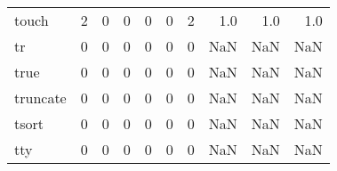 \begin{tabular}{lrrrrrrrrr}
touch     &                                                  2 &                                                  0 &                                                  0 &                                                  0 &                                                  0 &                                                  2 &                                                1.0 &                                    1.0 &                                  1.0 \\
tr        &                                                  0 &                                                  0 &                                                  0 &                                                  0 &                                                  0 &                                                  0 &                                                NaN &                                    NaN &                                  NaN \\
true      &                                                  0 &                                                  0 &                                                  0 &                                                  0 &                                                  0 &                                                  0 &                                                NaN &                                    NaN &                                  NaN \\
truncate  &                                                  0 &                                                  0 &                                                  0 &                                                  0 &                                                  0 &                                                  0 &                                                NaN &                                    NaN &                                  NaN \\
tsort     &                                                  0 &                                                  0 &                                                  0 &                                                  0 &                                                  0 &                                                  0 &                                                NaN &                                    NaN &                                  NaN \\
tty       &                                                  0 &                                                  0 &                                                  0 &                                                  0 &                                                  0 &                                                  0 &                                                NaN &                                    NaN &                                  NaN \\

\end{tabular}

